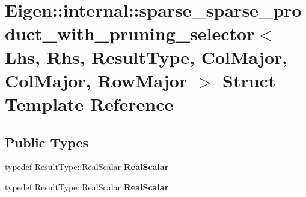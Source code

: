 \hypertarget{struct_eigen_1_1internal_1_1sparse__sparse__product__with__pruning__selector_3_01_lhs_00_01_rhs_21e1c567bb33db704730c4eb2830e598}{}\section{Eigen\+:\+:internal\+:\+:sparse\+\_\+sparse\+\_\+product\+\_\+with\+\_\+pruning\+\_\+selector$<$ Lhs, Rhs, Result\+Type, Col\+Major, Col\+Major, Row\+Major $>$ Struct Template Reference}
\label{struct_eigen_1_1internal_1_1sparse__sparse__product__with__pruning__selector_3_01_lhs_00_01_rhs_21e1c567bb33db704730c4eb2830e598}
\subsection*{Public Types}
\begin{DoxyCompactItemize}
\item 
\mbox{\label{struct_eigen_1_1internal_1_1sparse__sparse__product__with__pruning__selector_3_01_lhs_00_01_rhs_21e1c567bb33db704730c4eb2830e598_ac278b297a10554f7a626bec7b3c0e4ac}} 
typedef Result\+Type\+::\+Real\+Scalar {\bfseries Real\+Scalar}
\item 
\mbox{\label{struct_eigen_1_1internal_1_1sparse__sparse__product__with__pruning__selector_3_01_lhs_00_01_rhs_21e1c567bb33db704730c4eb2830e598_ac278b297a10554f7a626bec7b3c0e4ac}} 
typedef Result\+Type\+::\+Real\+Scalar {\bfseries Real\+Scalar}
\end{DoxyCompactItemize}
